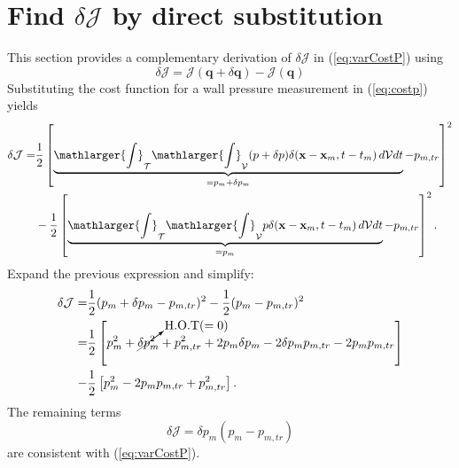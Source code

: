 

\section{Find $\delta \mathcal{J}$ by direct substitution}\label{ss:directSubstitution}
This section provides a complementary derivation of $\delta \mathcal{J}$ in (\ref{eq:varCostP}) using 
\begin{equation}
\delta \mathcal{J} = \mathcal{J}(\mathbf{q}+\delta\mathbf{q})-\mathcal{J}(\mathbf{q})
\end{equation}
Substituting the cost function for a wall pressure measurement in (\ref{eq:costp}) yields
\begin{align}
\delta\mathcal{J} = &\frac{1}{2} \left[\underbrace{\mathlarger{\int}_{\mathcal{T}}\mathlarger{\int}_{\mathcal{V}} (p+\delta p) \delta(\mathbf{x}-\mathbf{x}_m,t-t_m)\,d\mathcal{V} dt}_{=p_m+\delta p_m} - p_{m,tr}\right]^2\\
&-\frac{1}{2} \left[\underbrace{\mathlarger{\int}_{\mathcal{T}}\mathlarger{\int}_{\mathcal{V}} p \delta(\mathbf{x}-\mathbf{x}_m,t-t_m)\,d\mathcal{V} dt}_{=p_m} - p_{m,tr}\right]^2.
\end{align}
Expand the previous expression and simplify:
\begin{align}
\delta \mathcal{J}=&\frac{1}{2}(p_m + \delta p_m - p_{m,tr})^2 - \frac{1}{2}(p_m  - p_{m,tr})^2\\
=&\frac{1}{2}\left[p_m^2 + \cancelto{\text{H.O.T} (=0)}{\delta p_m^2} + p_{m,tr}^2+2p_m \delta p_m - 2\delta p_m p_{m,tr}-2 p_m p_{m,tr} \right]\\\nonumber
-&\frac{1}{2}\left[p_m^2 - 2p_m p_{m,tr} + p_{m,tr}^2 \right].
\end{align}
The remaining terms
\begin{equation}
   \delta \mathcal{J}=\delta p_m(p_m - p_{m,tr}) 
\end{equation}
are consistent with (\ref{eq:varCostP}).